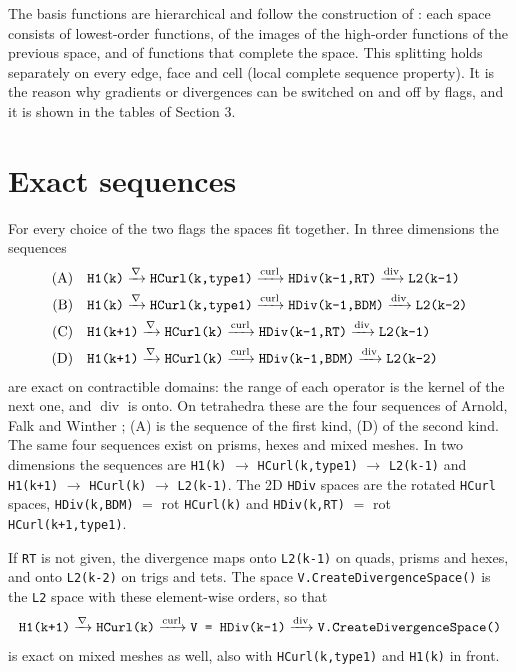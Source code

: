 \documentclass[10pt,a4paper]{article}
\newcommand{\code}[1]{\texttt{#1}}
\newcommand{\curl}{\operatorname{curl}}\renewcommand{\div}{\operatorname{div}}
\begin{document}
The basis functions are hierarchical and follow the construction of \cite{zaglmayr,sz05}: each space consists of lowest-order functions, of the images of the high-order functions of the previous space, and of functions that complete the space. This splitting holds separately on every edge, face and cell (local complete sequence property). It is the reason why gradients or divergences can be switched on and off by flags, and it is shown in the tables of Section 3.

\section{Exact sequences}

For every choice of the two flags the spaces fit together. In three dimensions the sequences
\begin{align*}
\text{(A)}\quad & \text{\code{H1(k)}} \xrightarrow{\nabla} \text{\code{HCurl(k,type1)}} \xrightarrow{\curl} \text{\code{HDiv(k-1,RT)}} \xrightarrow{\div} \text{\code{L2(k-1)}}\\
\text{(B)}\quad & \text{\code{H1(k)}} \xrightarrow{\nabla} \text{\code{HCurl(k,type1)}} \xrightarrow{\curl} \text{\code{HDiv(k-1,BDM)}} \xrightarrow{\div} \text{\code{L2(k-2)}}\\
\text{(C)}\quad & \text{\code{H1(k+1)}} \xrightarrow{\nabla} \text{\code{HCurl(k)}} \xrightarrow{\curl} \text{\code{HDiv(k-1,RT)}} \xrightarrow{\div} \text{\code{L2(k-1)}}\\
\text{(D)}\quad & \text{\code{H1(k+1)}} \xrightarrow{\nabla} \text{\code{HCurl(k)}} \xrightarrow{\curl} \text{\code{HDiv(k-1,BDM)}} \xrightarrow{\div} \text{\code{L2(k-2)}}
\end{align*}
are exact on contractible domains: the range of each operator is the kernel of the next one, and $\div$ is onto. On tetrahedra these are the four sequences of Arnold, Falk and Winther \cite{afw06}; (A) is the sequence of the first kind, (D) of the second kind. The same four sequences exist on prisms, hexes and mixed meshes.
In two dimensions the sequences are \code{H1(k)} $\to$ \code{HCurl(k,type1)} $\to$ \code{L2(k-1)} and \code{H1(k+1)} $\to$ \code{HCurl(k)} $\to$ \code{L2(k-1)}. The 2D \code{HDiv} spaces are the rotated \code{HCurl} spaces, \code{HDiv(k,BDM)} $=$ rot \code{HCurl(k)} and \code{HDiv(k,RT)} $=$ rot \code{HCurl(k+1,type1)}.

If \code{RT} is not given, the divergence maps onto \code{L2(k-1)} on quads, prisms and hexes, and onto \code{L2(k-2)} on trigs and tets. The space \code{V.CreateDivergenceSpace()} is the \code{L2} space with these element-wise orders, so that
\[
\text{\code{H1(k+1)}} \xrightarrow{\nabla} \text{\code{HCurl(k)}} \xrightarrow{\curl} \text{\code{V = HDiv(k-1)}} \xrightarrow{\div} \text{\code{V.CreateDivergenceSpace()}}
\]
is exact on mixed meshes as well, also with \code{HCurl(k,type1)} and \code{H1(k)} in front.
\end{document}
